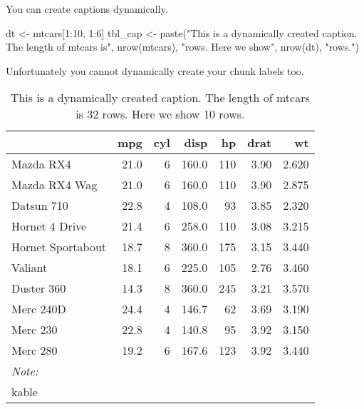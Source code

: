\documentclass[
  letterpaper,
  oneside]{scrbook}
\newenvironment{Shaded}{\begin{snugshade}}{\end{snugshade}}
\newcommand{\DecValTok}[1]{\textcolor[rgb]{0.68,0.00,0.00}{#1}}
\newcommand{\FunctionTok}[1]{\textcolor[rgb]{0.28,0.35,0.67}{#1}}
\newcommand{\NormalTok}[1]{\textcolor[rgb]{0.00,0.23,0.31}{#1}}
\newcommand{\OtherTok}[1]{\textcolor[rgb]{0.00,0.23,0.31}{#1}}
\newcommand{\SpecialCharTok}[1]{\textcolor[rgb]{0.37,0.37,0.37}{#1}}
\newcommand{\StringTok}[1]{\textcolor[rgb]{0.13,0.47,0.30}{#1}}
\begin{document}
You can create captions dynamically.

\begin{Shaded}
\begin{Highlighting}[]
\NormalTok{dt }\OtherTok{\textless{}{-}}\NormalTok{ mtcars[}\DecValTok{1}\SpecialCharTok{:}\DecValTok{10}\NormalTok{, }\DecValTok{1}\SpecialCharTok{:}\DecValTok{6}\NormalTok{]}
\NormalTok{tbl\_cap }\OtherTok{\textless{}{-}} \FunctionTok{paste}\NormalTok{(}\StringTok{"This is a dynamically created caption. The length of mtcars is"}\NormalTok{, }\FunctionTok{nrow}\NormalTok{(mtcars), }\StringTok{"rows. Here we show"}\NormalTok{, }\FunctionTok{nrow}\NormalTok{(dt), }\StringTok{"rows."}\NormalTok{)}
\end{Highlighting}
\end{Shaded}

Unfortunately you cannot dynamically create your chunk labels too.

\hypertarget{tbl-test3}{}
\begin{table}
\caption{\label{tbl-test3}This is a dynamically created caption. The length of mtcars is 32 rows.
Here we show 10 rows. }\tabularnewline

\centering
\begin{tabular}[t]{lrrrrrr}
\toprule
  & mpg & cyl & disp & hp & drat & wt\\
\midrule
Mazda RX4 & 21.0 & 6 & 160.0 & 110 & 3.90 & 2.620\\
Mazda RX4 Wag & 21.0 & 6 & 160.0 & 110 & 3.90 & 2.875\\
Datsun 710 & 22.8 & 4 & 108.0 & 93 & 3.85 & 2.320\\
Hornet 4 Drive & 21.4 & 6 & 258.0 & 110 & 3.08 & 3.215\\
Hornet Sportabout & 18.7 & 8 & 360.0 & 175 & 3.15 & 3.440\\
\addlinespace
Valiant & 18.1 & 6 & 225.0 & 105 & 2.76 & 3.460\\
Duster 360 & 14.3 & 8 & 360.0 & 245 & 3.21 & 3.570\\
Merc 240D & 24.4 & 4 & 146.7 & 62 & 3.69 & 3.190\\
Merc 230 & 22.8 & 4 & 140.8 & 95 & 3.92 & 3.150\\
Merc 280 & 19.2 & 6 & 167.6 & 123 & 3.92 & 3.440\\
\bottomrule
\multicolumn{7}{l}{\rule{0pt}{1em}\textit{Note: }}\\
\multicolumn{7}{l}{\rule{0pt}{1em}kable}\\
\end{tabular}
\end{table}
\end{document}
